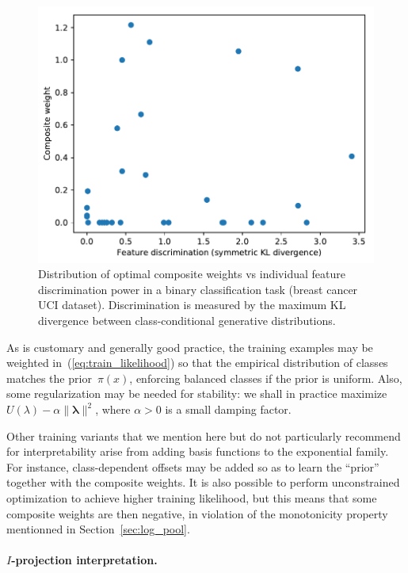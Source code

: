 \documentclass[english]{scrartcl}
\newcommand{\blambda}{{\boldsymbol{\lambda}}}
\begin{document}
\begin{figure}[!ht]
  \begin{center}
    \includegraphics[width=.6\textwidth]{disc_weight_plot.pdf}
  \end{center}
\caption{Distribution of optimal composite weights vs individual feature discrimination power in a binary classification task (breast cancer UCI dataset). Discrimination is measured by the maximum KL divergence between class-conditional generative distributions.}
\label{fig:disc_weight_plot}
\end{figure}

As is customary and generally good practice, the training examples may be weighted in~(\ref{eq:train_likelihood}) so that the empirical distribution of classes matches the prior~$\pi(x)$, enforcing balanced classes if the prior is uniform. Also, some regularization may be needed for stability: we shall in practice maximize $U(\lambda)-\alpha \|\blambda\|^2$, where $\alpha>0$ is a small damping factor.

Other training variants that we mention here but do not particularly recommend for interpretability arise from adding basis functions to the exponential family. For instance, class-dependent offsets may be added so as to learn the ``prior'' together with the composite weights. It is also possible to perform unconstrained optimization to achieve higher training likelihood, but this means that some composite weights are then negative, in violation of the monotonicity property mentionned in Section~\ref{sec:log_pool}.


\paragraph{$I$-projection interpretation.}
\end{document}
